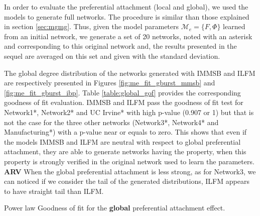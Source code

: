 \documentclass[a4paper, 12pt]{article}
\newcommand*{\lpath}{../}%
\begin{document}
In order to evaluate the preferential attachment (local and global), we used the models to generate full networks. The procedure  is similar than those explained in section \ref{sec:mgmg}. Thus, given the model parameters $\mathcal{M}_e = \{F ,\Phi\}$ learned from an initial network, we generate a set of 20 networks, noted with an asterisk and corresponding to this original network  and, the results presented in the sequel are averaged on this set and given with the standard deviation. 

The global degree distribution of the  networks generated with  IMMSB and ILFM are respectively presented in Figures \ref{fig:me_fit_gburst_mmsb} and \ref{fig:me_fit_gburst_ibp}. Table \ref{table:global_gof} provides  the corresponding goodness of fit evaluation.
IMMSB and ILFM pass the goodness of fit test for Network1*, Network2* and UC Irvine* with high p-value (0.907 or 1) but that is not the case  for the three other networks (Network3*, Network4* and Manufacturing*) with a p-value near or equals to zero. This shows that even if the models IMMSB and ILFM  are neutral with respect to global preferential attachment, they are able to generate  networks having the property,  when this property is strongly verified in the original network used to learn the parameters.
\textbf{ARV} When the global preferential attachment is less strong, as for Network3, we can noticed if we consider the tail of the generated distributions, ILFM appears to have straight tail than ILFM.




\begin{table}
    \caption{Power law Goodness of fit for the \textbf{global} preferential attachment effect.}
\centering
	
	
\label{table:global_gof}
\end{table}
\end{document}
